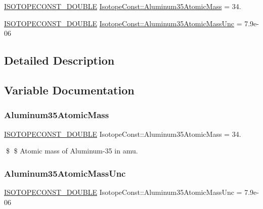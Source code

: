 \begin{DoxyCompactItemize}
\item 
\mbox{\hyperlink{group___isotope_const-_macros_ga8f45a7272ce02c0b4c65c44636ed719a}{I\+S\+O\+T\+O\+P\+E\+C\+O\+N\+S\+T\+\_\+\+D\+O\+U\+B\+LE}} \mbox{\hyperlink{group___isotope_const-_aluminum-_al35_ga9b66334d131591578cf8263b73d9e119}{Isotope\+Const\+::\+Aluminum35\+Atomic\+Mass}} = 34.
\item 
\mbox{\hyperlink{group___isotope_const-_macros_ga8f45a7272ce02c0b4c65c44636ed719a}{I\+S\+O\+T\+O\+P\+E\+C\+O\+N\+S\+T\+\_\+\+D\+O\+U\+B\+LE}} \mbox{\hyperlink{group___isotope_const-_aluminum-_al35_ga9aeec00d0535fbe0c3318f9d8e9ea385}{Isotope\+Const\+::\+Aluminum35\+Atomic\+Mass\+Unc}} = 7.\+9e-\/06
\end{DoxyCompactItemize}


\subsection{Detailed Description}


\subsection{Variable Documentation}
\mbox{\label{group___isotope_const-_aluminum-_al35_ga9b66334d131591578cf8263b73d9e119}} 
\subsubsection{\texorpdfstring{Aluminum35\+Atomic\+Mass}{Aluminum35AtomicMass}}
{\footnotesize\ttfamily \mbox{\hyperlink{group___isotope_const-_macros_ga8f45a7272ce02c0b4c65c44636ed719a}{I\+S\+O\+T\+O\+P\+E\+C\+O\+N\+S\+T\+\_\+\+D\+O\+U\+B\+LE}} Isotope\+Const\+::\+Aluminum35\+Atomic\+Mass = 34.}

\$ \$ Atomic mass of Aluminum-\/35 in amu. \mbox{\label{group___isotope_const-_aluminum-_al35_ga9aeec00d0535fbe0c3318f9d8e9ea385}} 
\subsubsection{\texorpdfstring{Aluminum35\+Atomic\+Mass\+Unc}{Aluminum35AtomicMassUnc}}
{\footnotesize\ttfamily \mbox{\hyperlink{group___isotope_const-_macros_ga8f45a7272ce02c0b4c65c44636ed719a}{I\+S\+O\+T\+O\+P\+E\+C\+O\+N\+S\+T\+\_\+\+D\+O\+U\+B\+LE}} Isotope\+Const\+::\+Aluminum35\+Atomic\+Mass\+Unc = 7.\+9e-\/06}

